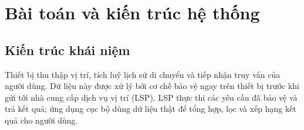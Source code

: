 \documentclass[12pt,a4paper,oneside]{report}
\begin{document}
\chapter{Bài toán và kiến trúc hệ thống}
\label{ch:architecture}

\section{Kiến trúc khái niệm}

Thiết bị thu thập vị trí, tích luỹ lịch sử di chuyển và tiếp nhận truy vấn của người dùng. Dữ liệu này được xử lý bởi cơ chế bảo vệ ngay trên thiết bị trước khi gửi tới nhà cung cấp dịch vụ vị trí (LSP). LSP thực thi các yêu cầu đã bảo vệ và trả kết quả; ứng dụng cục bộ dùng dữ liệu thật để tổng hợp, lọc và xếp hạng kết quả cho người dùng.
\end{document}
